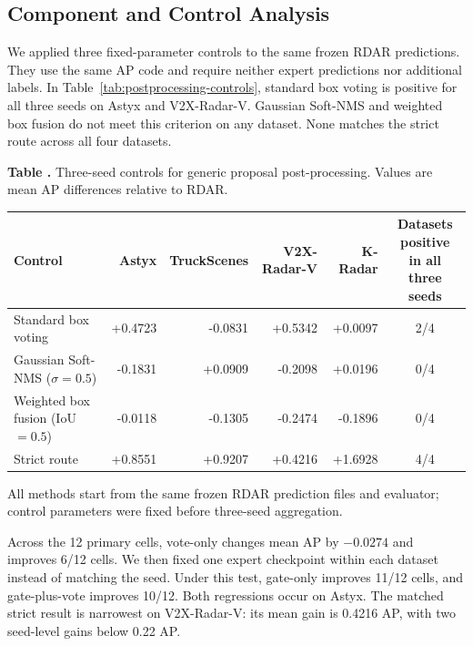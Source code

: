 \documentclass[sensors,article,submit,pdftex,moreauthors]{Definitions/mdpi}
\providecommand{\tabref}[1]{}
\renewcommand{\tabref}[1]{\textcolor{floatreviewblue}{Table~\ref{#1}}}
\renewcommand{\tabref}[1]{Table~\ref{#1}}
\begin{document}
\subsection{Component and Control Analysis}

We applied three fixed-parameter controls to the same frozen RDAR predictions.
They use the same AP code and require neither expert predictions nor additional
labels. In \tabref{tab:postprocessing-controls}, standard box voting is
positive for all three seeds on Astyx and V2X-Radar-V. Gaussian Soft-NMS and
weighted box fusion do not meet this criterion on any dataset. None matches
the strict route across all four datasets.

\begin{samepage}
\noindent\begin{minipage}{\textwidth}
\label{tab:postprocessing-controls}
\noindent\textbf{Table \thetable.} Three-seed controls for generic proposal
post-processing. Values are mean AP differences relative to RDAR.\par
\vspace{2pt}\scriptsize
\begin{tabularx}{\textwidth}{@{}Xrrrrc@{}}
\toprule
Control & Astyx & TruckScenes & V2X-Radar-V & K-Radar &
\shortstack{Datasets positive\\in all three seeds} \\
\midrule
Standard box voting & +0.4723 & -0.0831 & +0.5342 & +0.0097 & 2/4 \\
Gaussian Soft-NMS ($\sigma=0.5$) & -0.1831 & +0.0909 & -0.2098 & +0.0196 & 0/4 \\
Weighted box fusion (IoU $=0.5$) & -0.0118 & -0.1305 & -0.2474 & -0.1896 & 0/4 \\
Strict route & +0.8551 & +0.9207 & +0.4216 & +1.6928 & 4/4 \\
\bottomrule
\end{tabularx}
\vspace{2pt}\parbox{\textwidth}{\scriptsize
All methods start from the same frozen RDAR prediction files and evaluator;
control parameters were fixed before three-seed aggregation.}
\end{minipage}\end{samepage}

Across the 12 primary cells, vote-only changes mean AP by $-0.0274$ and
improves 6/12 cells. We then fixed one expert checkpoint within each dataset
instead of matching the seed. Under this test, gate-only improves 11/12 cells,
and gate-plus-vote improves 10/12. Both regressions occur on Astyx. The matched
strict result is narrowest on V2X-Radar-V: its mean gain is 0.4216 AP, with two
seed-level gains below 0.22 AP.
\end{document}
